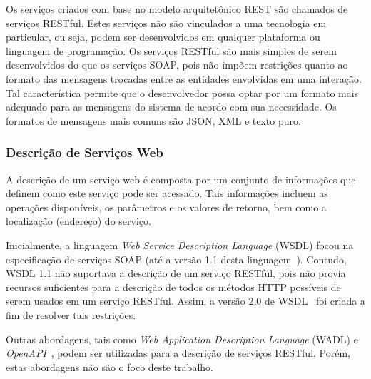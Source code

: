Os serviços criados com base no modelo arquitetônico REST são chamados de serviços RESTful. Estes serviços não são vinculados a uma tecnologia em particular, ou seja, podem ser desenvolvidos em qualquer plataforma ou linguagem de programação. Os serviços RESTful são mais simples de serem desenvolvidos do que os serviços SOAP, pois não impõem restrições quanto ao formato das mensagens trocadas entre as entidades envolvidas em uma interação. Tal característica permite que o desenvolvedor possa optar por um formato mais adequado para as mensagens do sistema de acordo com sua necessidade. Os formatos de mensagens mais comuns são JSON, XML e texto puro.


\subsubsection{Descrição de Serviços Web}\label{2-fundamentacao-dbs-servicos-web-descricao-servico-web}


A descrição de um serviço web é composta por um conjunto de informações que definem como este serviço pode ser acessado. Tais informações incluem as operações disponíveis, os parâmetros e os valores de retorno, bem como a localização (endereço) do serviço.

Inicialmente, a linguagem \textit{Web Service Description Language} (WSDL) focou na especificação de serviços SOAP (até a versão 1.1 desta linguagem~\cite{W3C-2001-WSDL1.1}). Contudo, WSDL 1.1 não suportava a descrição de um serviço RESTful, pois não provia recursos suficientes para a descrição de todos os métodos HTTP possíveis de serem usados em um serviço RESTful. Assim, a versão 2.0 de WSDL~\cite{W3C-2007-WSDL} foi criada a fim de resolver tais restrições.

Outras abordagens, tais como \textit{Web Application Description Language} (WADL) \cite{W3C-2009-WADL} e \textit{OpenAPI}~\cite{SWAGGER-2017-OpenAPI-Specification}, podem ser utilizadas para a descrição de serviços RESTful. Porém, estas abordagens não são o foco deste trabalho.

